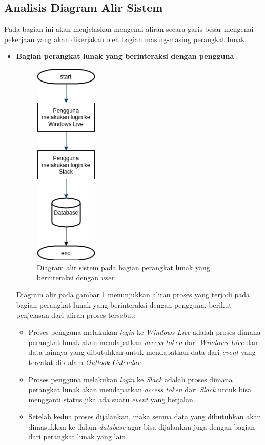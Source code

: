 \subsection{Analisis Diagram Alir Sistem} 
\label{sec:diagram_alir_sistem}
Pada bagian ini akan menjelaskan mengenai aliran secara garis besar mengenai pekerjaan yang akan dikerjakan oleh bagian masing-masing perangkat lunak.
\begin{itemize}
    \item \textbf{Bagian perangkat lunak yang berinteraksi dengan pengguna}
    \begin{figure}[h]
      \includegraphics[width=3cm]{./Gambar/workflow.png}
      \centering
      \caption{Diagram alir sistem pada bagian perangkat lunak yang berinteraksi dengan \textit{user}.}
      \label{fig:workflow1}
    \end{figure}
    
    Diagram alir pada gambar \ref{fig:workflow1} menunjukkan aliran proses yang terjadi pada bagian perangkat lunak yang berinteraksi dengan pengguna, berikut penjelasan dari aliran proses tersebut:
    \begin{itemize}
        \item Proses pengguna melakukan \textit{login} ke \textit{Windows Live} adalah proses dimana perangkat lunak akan mendapatkan \textit{access token} dari \textit{Windows Live} dan data lainnya yang dibutuhkan untuk mendapatkan data dari \textit{event} yang tercatat di dalam \textit{Outlook Calendar}. 
        \item Proses pengguna melakukan \textit{login} ke \textit{Slack} adalah proses dimana perangkat lunak akan mendapatkan \textit{access token} dari \textit{Slack} untuk bisa mengganti status jika ada suatu \textit{event} yang berjalan. 
        \item Setelah kedua proses dijalankan, maka semua data yang dibutuhkan akan dimasukkan ke dalam \textit{database} agar bisa dijalankan juga dengan bagian dari perangkat lunak yang lain. 
    \end{itemize}
    

\end{itemize}
